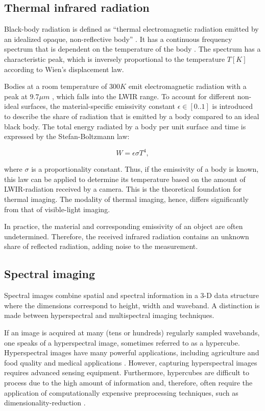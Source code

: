 \documentclass{l4proj}
\begin{document}
\subsection{Thermal infrared radiation}
\label{thermal_ir}

Black-body radiation is defined as ``thermal electromagnetic radiation emitted by an idealized opaque, non-reflective body'' \citep{young_sears_2012}. It has a continuous frequency spectrum that is dependent on the temperature of the body \citep{kogure_thermodynamic_2007}. The spectrum has a characteristic peak, which is inversely proportional to the temperature $T [K]$ according to Wien's displacement law. 

Bodies at a room temperature of $300 K$ emit electromagnetic radiation with a peak at $9.7 \mu m$ \citep{jarc_graz_2007}, which falls into the LWIR range. To account for different non-ideal surfaces, the material-specific emissivity constant $\epsilon \in [0..1]$ is introduced to describe the share of radiation that is emitted by a body compared to an ideal black body. The total energy radiated by a body per unit surface and time is expressed by the Stefan-Boltzmann law:

\begin{equation}
  W = \epsilon \sigma T^4,
\end{equation}

where $\sigma$ is a proportionality constant. Thus, if the emissivity of a body is known, this law can be applied to determine its temperature based on the amount of LWIR-radiation received by a camera. This is the theoretical foundation for thermal imaging. The modality of thermal imaging, hence, differs significantly from that of visible-light imaging.

In practice, the material and corresponding emissivity of an object are often undetermined. Therefore, the received infrared radiation contains an unknown share of reflected radiation, adding noise to the measurement.


\subsection{Spectral imaging}

Spectral images combine spatial and spectral information in a 3-D data structure where the dimensions correspond to height, width and waveband. 
A distinction is made between hyperspectral and multispectral imaging techniques. 

If an image is acquired at many (tens or hundreds) regularly sampled wavebands, one speaks of a hyperspectral image, sometimes referred to as a hypercube. Hyperspectral images have many powerful applications, including agriculture and food quality \citep{dale_hyperspectral_2013} and medical applications \citep{lu_medical_2014}. However, capturing hyperspectral images requires advanced sensing equipment. Furthermore, hypercubes are difficult to process due to the high amount of information and, therefore, often require the application of computationally expensive preprocessing techniques, such as dimensionality-reduction \citep{qin_hyperspectral_2013}.
\end{document}
